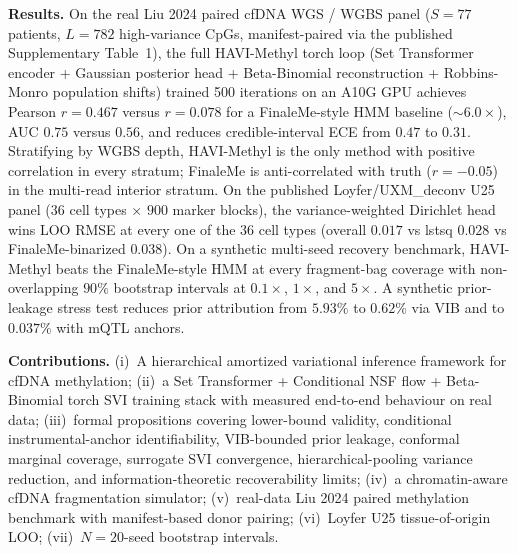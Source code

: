 {\smallskip\textbf{Results.} On the real Liu 2024 paired cfDNA WGS / WGBS panel ($S=77$ patients, $L=782$ high-variance CpGs, manifest-paired via the published Supplementary Table~1), the full HAVI-Methyl torch loop (Set Transformer encoder + Gaussian posterior head + Beta-Binomial reconstruction + Robbins-Monro population shifts) trained 500 iterations on an A10G GPU achieves Pearson $r = 0.467$ versus $r = 0.078$ for a FinaleMe-style HMM baseline ($\sim 6.0\times$), AUC $0.75$ versus $0.56$, and reduces credible-interval ECE from $0.47$ to $0.31$. Stratifying by WGBS depth, HAVI-Methyl is the only method with positive correlation in every stratum; FinaleMe is anti-correlated with truth ($r=-0.05$) in the multi-read interior stratum. On the published Loyfer/UXM\_deconv U25 panel ($36$ cell types $\times$ $900$ marker blocks), the variance-weighted Dirichlet head wins LOO RMSE at every one of the $36$ cell types (overall $0.017$ vs lstsq $0.028$ vs FinaleMe-binarized $0.038$). On a synthetic multi-seed recovery benchmark, HAVI-Methyl beats the FinaleMe-style HMM at every fragment-bag coverage with non-overlapping $90\%$ bootstrap intervals at $0.1\times$, $1\times$, and $5\times$. A synthetic prior-leakage stress test reduces prior attribution from $5.93\%$ to $0.62\%$ via VIB and to $0.037\%$ with mQTL anchors.

\smallskip\textbf{Contributions.} (i)~A hierarchical amortized variational inference framework for cfDNA methylation; (ii)~a Set Transformer + Conditional NSF flow + Beta-Binomial torch SVI training stack with measured end-to-end behaviour on real data; (iii)~formal propositions covering lower-bound validity, conditional instrumental-anchor identifiability, VIB-bounded prior leakage, conformal marginal coverage, surrogate SVI convergence, hierarchical-pooling variance reduction, and information-theoretic recoverability limits; (iv)~a chromatin-aware cfDNA fragmentation simulator; (v)~real-data Liu 2024 paired methylation benchmark with manifest-based donor pairing; (vi)~Loyfer U25 tissue-of-origin LOO; (vii)~$N{=}20$-seed bootstrap intervals.
}
